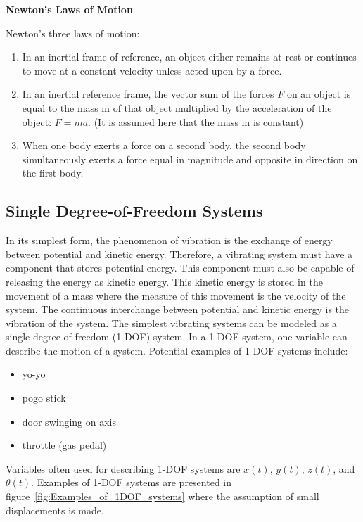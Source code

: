 \documentclass[12pt,letter]{article}
\begin{document}
	\begin{review}

		\textbf{Newton's Laws of Motion}

		\noindent Newton's three laws of motion:
		\begin{enumerate}
			\item In an inertial frame of reference, an object either remains at rest or continues to move at a constant velocity unless acted upon by a force.
			\item In an inertial reference frame, the vector sum of the forces $F$ on an object is equal to the mass m of that object multiplied by the acceleration of the object: $F = ma$. (It is assumed here that the mass m is constant)
			\item When one body exerts a force on a second body, the second body simultaneously exerts a force equal in magnitude and opposite in direction on the first body.
		\end{enumerate}
	\end{review}

	\subsection{Single Degree-of-Freedom Systems}
	
        In its simplest form, the phenomenon of vibration is the exchange of energy between potential and kinetic energy. Therefore, a vibrating system must have a component that stores potential energy. This component must also be capable of releasing the energy as kinetic energy. This kinetic energy is stored in the movement of a mass where the measure of this movement is the velocity of the system. The continuous interchange between potential and kinetic energy is the vibration of the system. The simplest vibrating systems can be modeled as a single-degree-of-freedom (1-DOF) system. In a 1-DOF system, one variable can describe the motion of a system. Potential examples of 1-DOF systems include:
		\begin{itemize}
			\item yo-yo
			\item pogo stick
			\item door swinging on axis
			\item throttle (gas pedal)
		\end{itemize}
				
		Variables often used for describing 1-DOF systems are $x(t)$,  $y(t)$,  $z(t)$, and  $\theta(t)$.  Examples of 1-DOF systems are presented in figure~\ref{fig:Examples_of_1DOF_systems} where the assumption of small displacements is made. 
\end{document}
